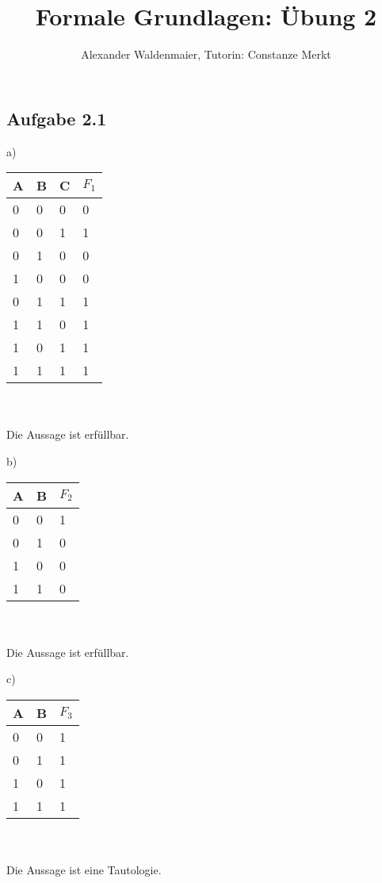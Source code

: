 \documentclass{article}
\title{Formale Grundlagen: Übung 2}
\author{Alexander Waldenmaier, Tutorin: Constanze Merkt}
\begin{document}
    \maketitle
    \subsection*{Aufgabe 2.1}
    \begin{minipage}[t]{0.3\textwidth}
        a)
        \begin{tabular}[t]{lll|l}
            A & B & C & $F_1$ \\
            \hline
            0 & 0 & 0 & 0 \\
            0 & 0 & 1 & 1 \\
            0 & 1 & 0 & 0 \\
            1 & 0 & 0 & 0 \\
            0 & 1 & 1 & 1 \\
            1 & 1 & 0 & 1 \\
            1 & 0 & 1 & 1 \\
            1 & 1 & 1 & 1 \\
        \end{tabular} \\\\
        Die Aussage ist erfüllbar.
    \end{minipage}
    \begin{minipage}[t]{0.3\textwidth}
        b)
        \begin{tabular}[t]{ll|l}
            A & B & $F_2$ \\
            \hline
            0 & 0 & 1 \\
            0 & 1 & 0 \\
            1 & 0 & 0 \\
            1 & 1 & 0
        \end{tabular} \\\\
        \vfill
        Die Aussage ist erfüllbar.
    \end{minipage}
    \begin{minipage}[t]{0.3\textwidth}
        c)
        \begin{tabular}[t]{ll|l}
            A & B & $F_3$ \\
            \hline
            0 & 0 & 1 \\
            0 & 1 & 1 \\
            1 & 0 & 1 \\
            1 & 1 & 1
        \end{tabular} \\\\
        \vfill
        Die Aussage ist eine Tautologie.
    \end{minipage}
\end{document}
